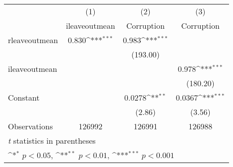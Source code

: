 {
\def\sym#1{\ifmmode^{#1}\else\(^{#1}\)\fi}
\begin{tabular}{l*{3}{c}}
\hline\hline
                    &\multicolumn{1}{c}{(1)}&\multicolumn{1}{c}{(2)}&\multicolumn{1}{c}{(3)}\\
                    &\multicolumn{1}{c}{ileaveoutmean}&\multicolumn{1}{c}{Corruption}&\multicolumn{1}{c}{Corruption}\\
\hline
rleaveoutmean       &       0.830\sym{***}&       0.983\sym{***}&                     \\
                    &                     &    (193.00)         &                     \\
[1em]
ileaveoutmean       &                     &                     &       0.978\sym{***}\\
                    &                     &                     &    (180.20)         \\
[1em]
Constant            &                     &      0.0278\sym{**} &      0.0367\sym{***}\\
                    &                     &      (2.86)         &      (3.56)         \\
\hline
Observations        &      126992         &      126991         &      126988         \\
\hline\hline
\multicolumn{4}{l}{\footnotesize \textit{t} statistics in parentheses}\\
\multicolumn{4}{l}{\footnotesize \sym{*} \(p<0.05\), \sym{**} \(p<0.01\), \sym{***} \(p<0.001\)}\\
\end{tabular}
}
